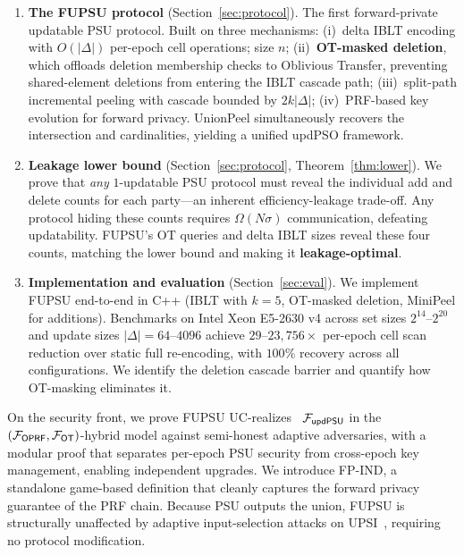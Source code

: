 \begin{enumerate}
\item \textbf{The FUPSU protocol} (Section~\ref{sec:protocol}). The first
forward-private updatable PSU protocol. Built on three mechanisms: (i)~delta IBLT
encoding with $O(|\Delta|)$ per-epoch cell operations;
size $n$; (ii)~\textbf{OT-masked deletion}, which offloads deletion membership
checks to Oblivious Transfer, preventing shared-element deletions from entering
the IBLT cascade path; (iii)~split-path incremental peeling with cascade bounded
by $2k|\Delta|$; (iv)~PRF-based key evolution for forward privacy. UnionPeel
simultaneously recovers the intersection and cardinalities, yielding a unified
updPSO framework.

\item \textbf{Leakage lower bound} (Section~\ref{sec:protocol}, Theorem~\ref{thm:lower}). We prove that
\emph{any} $1$-updatable PSU protocol must reveal the individual add and delete
counts for each party---an inherent efficiency-leakage trade-off. Any protocol
hiding these counts requires $\Omega(N\sigma)$ communication, defeating
updatability. FUPSU's OT queries and delta IBLT sizes reveal these four counts,
matching the lower bound and making it \textbf{leakage-optimal}.

\item \textbf{Implementation and evaluation} (Section~\ref{sec:eval}).
We implement FUPSU end-to-end in C++ (IBLT with $k{=}5$, OT-masked deletion,
MiniPeel for additions). Benchmarks on Intel Xeon E5-2630 v4 across set sizes
$2^{14}$--$2^{20}$ and update sizes $|\Delta|=64$--$4096$ achieve
$29$--$23{,}756\times$ per-epoch cell scan reduction over static full
re-encoding, with $100\%$ recovery across all configurations. We identify
the deletion cascade barrier and quantify how OT-masking eliminates it.
\end{enumerate}

\smallskip\noindent
On the security front, we prove FUPSU UC-realizes~\cite{Can01}
$\mathcal{F}_{\mathsf{updPSU}}$ in the $(\mathcal{F}_{\mathsf{OPRF}},
\mathcal{F}_{\mathsf{OT}})$-hybrid model against semi-honest adaptive adversaries,
with a modular proof that separates per-epoch PSU security from cross-epoch
key management, enabling independent upgrades. We introduce FP-IND, a
standalone game-based definition that cleanly captures the forward privacy
guarantee of the PRF chain. Because PSU outputs the union, FUPSU is
structurally unaffected by adaptive input-selection attacks
on UPSI~\cite{LMR+26}, requiring no protocol modification.

